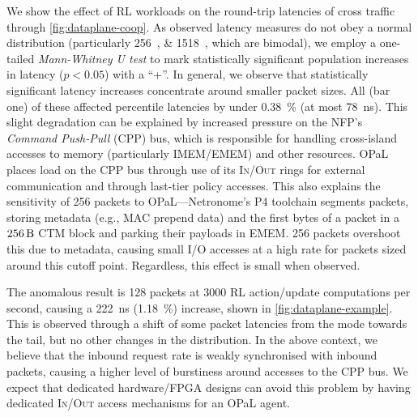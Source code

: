 \documentclass[
sigconf,natbib=false
]{acmart}
\newcommand{\approachshort}{OPaL}
\newcommand{\inring}{\textsc{In}}
\newcommand{\outring}{\textsc{Out}}
\begin{document}
We show the effect of RL workloads on the round-trip latencies of cross traffic through \cref{fig:dataplane-coop}.
As observed latency measures do not obey a normal distribution (particularly \SIlist{256;1518}{\byte}, which are bimodal), we employ a one-tailed \emph{Mann-Whitney U test} to mark statistically significant population increases in latency ($p < 0.05$) with a ``+''.
In general, we observe that statistically significant latency increases concentrate around smaller packet sizes.
All (bar one) of these affected  percentile latencies by under \SI{0.38}{\percent} (at most \SI{78}{\nano\second}).
This slight degradation can be explained by increased pressure on the NFP's \emph{Command Push-Pull} (CPP) bus, which is responsible for handling cross-island accesses to memory (particularly IMEM/EMEM) and other resources.
\approachshort{} places load on the CPP bus through use of its \inring{}/\outring{} rings for external communication and through last-tier policy accesses.
This also explains the sensitivity of \SI{256}{\byte} packets to \approachshort{}---Netronome's P4 toolchain segments packets, storing metadata (e.g., MAC prepend data) and the first bytes of a packet in a $\SI{256}{\byte}$ CTM block and parking their payloads in EMEM.
\SI{256}{\byte} packets overshoot this due to metadata, causing small I/O accesses at a high rate for packets sized around this cutoff point.
Regardless, this effect is small when observed.

The anomalous result is \SI{128}{\byte} packets at \num{3000} RL action/update computations per second, causing a \SI{222}{\nano\second} (\SI{1.18}{\percent}) increase, shown in \cref{fig:dataplane-example}.
This is observed through a shift of some packet latencies from the mode towards the tail, but no other changes in the distribution.
In the above context, we believe that the inbound request rate is weakly synchronised with inbound packets, causing a higher level of burstiness around accesses to the CPP bus.
We expect that dedicated hardware/FPGA designs can avoid this problem by having dedicated \inring{}/\outring{} access mechanisms for an \approachshort{} agent.
\end{document}
